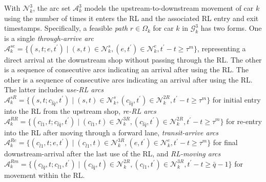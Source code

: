 \documentclass[12pt]{article}
\begin{document}
With $\mathcal{N}^3_k$, the arc set $\mathcal{A}^3_k$ models the upstream-to-downstream movement of car $k$ using the number of times it enters the RL and the associated RL entry and exit timestamps. Specifically, a feasible \textit{path} $r\in \Omega_k$ for car $k$ in $\mathcal{G}^3_k$ has two forms. One is a single \textit{through-arrive arc} $\mathcal{A}^{se}_k=\{(s,t;e,t^{\prime})\mid (s,t)\in \mathcal{N}^s_k,(e,t^{\prime})\in \mathcal{N}^e_k,t^{\prime}-t\geqslant \tau^m\}$, representing a direct arrival at the downstream shop without passing through the RL. The other is a sequence of consecutive arcs indicating an arrival after using the RL. The other is a sequence of consecutive arcs indicating an arrival after using the RL. The latter includes \textit{use-RL arcs} $\mathcal{A}^{sR}_k=\{(s,t;c_{\bar{l}\bar{q}},t^{\prime})\mid (s,t)\in \mathcal{N}^s_k,(c_{\bar{l}\bar{q}},t^{\prime})\in \mathcal{N}^{2R}_k,t^{\prime}-t\geqslant \tau^m\}$ for initial entry into the RL from the upstream shop, \textit{re-RL arcs} $\mathcal{A}^{RR}_k=\{(c_{\bar{l}1},t;c_{\bar{l}\bar{q}},t^{\prime})\mid (c_{\bar{l}1},t)\in \mathcal{N}^{3R}_k,(c_{\bar{l}\bar{q}},t^{\prime})\in \mathcal{N}^{2R}_k,t^{\prime}-t\geqslant \tau^m\}$ for re-entry into the RL after moving through a forward lane, \textit{transit-arrive arcs} $\mathcal{A}^{Re}_k=\{(c_{\bar{l}1},t;e,t^{\prime})\mid (c_{\bar{l}1},t)\in \mathcal{N}^{3R}_k,(e,t^{\prime})\in \mathcal{N}^e_k,t^{\prime}-t\geqslant \tau^m\}$ for final downstream-arrival after the last use of the RL, and \textit{RL-moving arcs} $\mathcal{A}^{Rm}_k=\{(c_{\bar{l}\bar{q}},t;c_{\bar{l}1},t^{\prime})\mid (c_{\bar{l}\bar{q}},t)\in \mathcal{N}^{2R}_k,(c_{\bar{l}1},t^{\prime})\in \mathcal{N}^{3R}_k,t^{\prime}-t\geqslant \bar{q}-1\}$ for movement within the RL.
\end{document}

